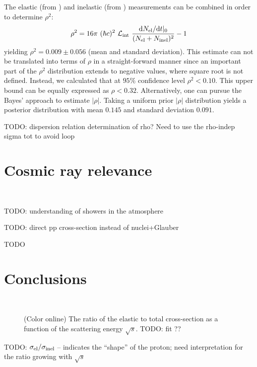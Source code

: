 \documentclass[doublecol]{../macros/epl2}
\def\d{{\rm d}}
\begin{document}
The elastic (from \cite{P1}) and inelastic (from \cite{P2}) measurements can be combined in order to determine $\rho^2$:
\begin{equation}
\label{eq:rho}
\rho^2 = 16\pi\ (\hbar c)^2\ {\cal L_{\rm int}}\ {\d N_{\rm el}/\d t|_0\over (N_{\rm el} + N_{\rm inel})^2} - 1
\end{equation}
yielding $\rho^2 = 0.009 \pm 0.056$ (mean and standard deviation). This estimate can not be translated into terms of $\rho$ in a straight-forward manner since an important part of the $\rho^2$ distribution extends to negative values, where square root is not defined. Instead, we calculated that at $95\%$ confidence level $\rho^2 < 0.10$. This upper bound can be equally expressed as $\rho < 0.32$. Alternatively, one can pursue the Bayes' approach to estimate $|\rho|$. Taking a uniform prior $|\rho|$ distribution yields a posterior distribution with mean $0.145$ and standard deviation $0.091$.

TODO: dispersion relation determination of rho? Need to use the rho-indep sigma tot to avoid loop



\section{Cosmic ray relevance}

~

TODO: understanding of showers in the atmosphere

TODO: direct pp cross-section instead of nuclei+Glauber

TODO
	


\section{Conclusions}

~

\begin{figure}
\vskip-5mm
\caption{(Color online) The ratio of the elastic to total cross-section as a function of the scattering energy $\sqrt s$. TODO: fit ??}
\label{fig:sigma rat}
\end{figure}

TODO: $\sigma_{\rm el} / \sigma_{\rm inel}$ -- indicates the ``shape'' of the proton; need interpretation for the ratio growing with $\sqrt s$
\end{document}
